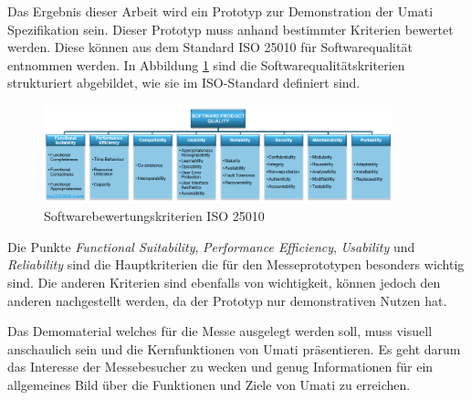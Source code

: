\documentclass[a4paper, 12pt, oneside]{scrbook}
\begin{document}
	
	Das Ergebnis dieser Arbeit wird ein Prototyp zur Demonstration der Umati Spezifikation sein. Dieser Prototyp muss anhand bestimmter Kriterien bewertet werden. Diese können aus dem Standard ISO 25010 für Softwarequalität entnommen werden. In Abbildung \ref{fig:ISO25010} sind die Softwarequalitätskriterien strukturiert abgebildet, wie sie im ISO-Standard definiert sind. 
	
	\begin{figure}[H]
		\centering
		\includegraphics[width=0.9\textwidth]{res/diagramms/iso25010.png}
		\caption{Softwarebewertungskriterien ISO 25010} 
		\label{fig:ISO25010}
	\end{figure}
	
	Die Punkte \textit{Functional Suitability}, \textit{Performance Efficiency}, \textit{Usability} und \textit{Reliability} sind die Hauptkriterien die für den Messeprototypen besonders wichtig sind. Die anderen Kriterien sind ebenfalls von wichtigkeit, können jedoch den anderen nachgestellt werden, da der Prototyp nur demonstrativen Nutzen hat. 
	
	
	Das Demomaterial welches für die Messe ausgelegt werden soll, muss visuell anschaulich sein und die Kernfunktionen von Umati präsentieren. Es geht darum das Interesse der Messebesucher zu wecken und genug Informationen für ein allgemeines Bild über die Funktionen und Ziele von Umati zu erreichen. 
	
	
	
	
\end{document}

